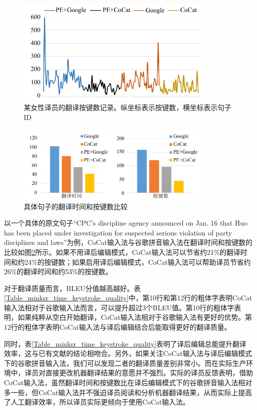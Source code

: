 \begin{figure}[!htb]
	\centering
	\includegraphics[width=0.85\textwidth]{Figure/Figure_3_8.pdf}
	\caption{某女性译员的翻译按键数记录。纵坐标表示按键数，横坐标表示句子ID}
	\label{Fig_translator_keysroke}
\end{figure}

\begin{figure}[!htb]
	\centering
	\includegraphics[width=0.85\textwidth]{Figure/Figure_3_9.pdf}
	\caption{具体句子的翻译时间和按键数比较}
	\label{Fig_sentence_keysroke}
\end{figure}

以一个具体的原文句子“CPC's discipline agency announced on Jan. 16 that Huo has been placed under investigation for suspected serious violation of party disciplines and laws”为例，CoCat输入法与谷歌拼音输入法在翻译时间和按键数的比较如图\ref{Fig_sentence_keysroke}所示。如果不用译后编辑模式，CoCat输入法可以节省约21\%的翻译时间和约24\%的按键数；如果启用译后编辑模式，CoCat输入法可以帮助译员节省约26\%的翻译时间和约53\%的按键数。

对于翻译质量而言，BLEU分值越高越好。表\ref{Table_minksr_time_keystroke_quality}中，第10行和第12行的粗体字表明CoCat输入法相对于谷歌输入法而言，可以提升超过3个BLEU值。第10行的粗体字表明，如果纯粹从空白开始翻译，CoCat输入法相对于谷歌输入法有更好的优势。第12行的粗体字表明CoCat输入法与译后编辑结合后能取得更好的翻译质量。

同时，表\ref{Table_minksr_time_keystroke_quality}表明了译后编辑总能提升翻译效率，这与已有文献的结论相吻合。另外，如果关注CoCat输入法与译后编辑模式下的谷歌拼音输入法，我们可以发现二者的翻译质量差别非常小。而在实际生产环境中，译员对直接更改机器翻译结果的意愿并不强烈。实际的译员反馈表明，借助CoCat输入法，虽然翻译时间和按键数比在译后编辑模式下的谷歌拼音输入法相对多一些，但CoCat输入法并不强迫译员阅读和分析机器翻译结果，从而实际上提高了人工翻译效率，所以译员实际更倾向于使用CoCat输入法。

